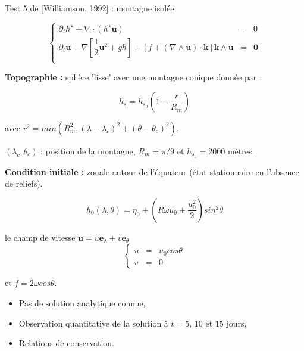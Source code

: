 \documentclass[11pt]{beamer}
\begin{document}
\begin{frame}{Test 5 de [Williamson, 1992] : montagne isolée}

\begin{equation}
\left\lbrace
\begin{array}{rcl}
\partial_t h^{\star} + \nabla \cdot \left( h^{\star} \mathbf{u} \right) & = & 0 \\
\partial_t \mathbf{u} + \nabla \left[ \dfrac{1}{2} \mathbf{u}^2 + gh \right] + \left[f + \left( \nabla \wedge \mathbf{u} \right) \cdot \mathbf{k} \right] \mathbf{k} \wedge \mathbf{u} & = & \mathbf{0} \\
\end{array}
\right.
\end{equation}

\textbf{Topographie :} sphère 'lisse' avec une montagne conique donnée par :

\begin{equation}
h_s = h_{s_0} \left( 1 - \dfrac{r}{R_m} \right)
\end{equation}

avec $r^2=min(R_m^2, (\lambda-\lambda_c)^2 + (\theta-\theta_c)^2)$.

$(\lambda_c, \theta_c)$ : position de la montagne,
$R_m = \pi / 9$ et $h_{s_0}=2000$ mètres.


\end{frame}

\begin{frame}

\textbf{Condition initiale :} zonale autour de l'équateur (état stationnaire en l'absence de reliefs).

$$h_0(\lambda, \theta)=\eta_0 + \left( R \omega u_0 +\dfrac{u_0^2}{2} \right) sin^2 \theta$$

le champ de vitesse $\mathbf{u} = u \mathbf{e}_{\lambda}+v \mathbf{e}_{\theta}$
$$\left\lbrace
\begin{array}{rcl}
u&=&u_0 cos \theta \\
v&=&0
\end{array}
\right.$$

et $f=2 \omega cos \theta$.

\pause
\vspace{0.8cm}
\begin{itemize}
\item Pas de solution analytique connue,

\item Observation quantitative de la solution à $t=5$, $10$ et $15$ jours,

\item Relations de conservation.
\end{itemize}
\end{frame}
\end{document}
